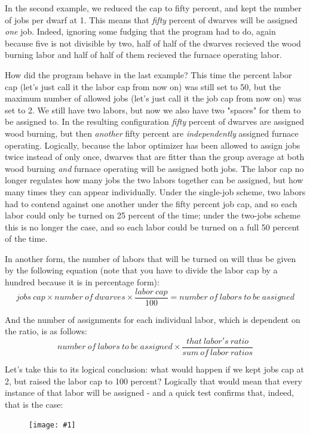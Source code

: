 \documentclass[]{article}
\newcommand{\fullfigure}[1] {
\begin{figure}[h!]
\texttt{[image: \#1]}
\end{figure}
}
\begin{document}
In the second example, we reduced the cap to fifty percent, and kept the number of jobs per dwarf at 1.
This means that \emph{fifty} percent of dwarves will be assigned \emph{one} job. Indeed, ignoring some
fudging that the program had to do, again because five is not divisible by two, half of half of the
dwarves recieved the wood burning labor and half of half of them recieved the furnace operating labor.

How did the program behave in the last example? This time the percent labor cap (let's just call it the
labor cap from now on) was still set to 50, but the maximum number of allowed jobs (let's just call it
the job cap from now on) was set to 2. We still have two labors, but now we also have two "spaces" for
them to be assigned to. In the resulting configuration \emph{fifty} percent of dwarves are assigned wood
burning, but then \emph{another} fifty percent are \emph{independently} assigned furnace operating.
Logically, because the labor optimizer has been allowed to assign jobs twice instead of only once,
dwarves that are fitter than the group average at both wood burning \emph{and} furnace operating will be
assigned both jobs. The labor cap no longer regulates how many jobs the two labors together can be
assigned, but how many times they can appear individually. Under the single-job scheme, two labors had to
contend against one another under the fifty percent job cap, and so each labor could only be turned on 25
percent of the time; under the two-jobs scheme this is no longer the case, and so each labor could be
turned on a full 50 percent of the time.

In another form, the number of labors that will be turned on will thus be given by the following equation
(note that you have to divide the labor cap by a hundred because it is in percentage form):
\begin{displaymath}
jobs\:cap \times number\:of\:dwarves \times  \frac{labor\:cap}{100} = number\:of\:labors\:to\:be\:assigned
\end{displaymath}

And the number of assignments for each individual labor, which is dependent on the ratio, is as follows:
\begin{displaymath}
number\:of\:labors\:to\:be\:assigned \times \frac{that\:labor's\:ratio}{sum\:of\:labor\:ratios}
\end{displaymath}

Let's take this to its logical conclusion: what would happen if we kept jobs cap at 2, but raised the
labor cap to 100 percent? Logically that would mean that every instance of that labor will be assigned -
and a quick test confirms that, indeed, that is the case:
\fullfigure{Sec4Fig13}
\end{document}
